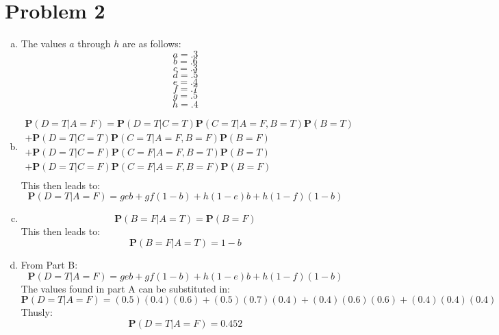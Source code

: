 \documentclass[12pt]{article}%
\begin{document}
\section*{Problem 2}
    \begin{enumerate}[a)]
        \item The values $a$ through $h$ are as follows:
            \[a=.3\]
            \[b=.6\]
            \[c=.3\]
            \[d=.5\]
            \[e=.4\]
            \[f=.7\]
            \[g=.5\]
            \[h=.4\]
        \newpage
        \item
            \begin{align*}
                \textbf{P}(D=T | A=F) = \textbf{P}(D=T|C=T)\textbf{P}(C=T|A=F,B=T)\textbf{P}(B=T)\\
                +\textbf{P}(D=T|C=T)\textbf{P}(C=T|A=F,B=F)\textbf{P}(B=F)\\
                +\textbf{P}(D=T|C=F)\textbf{P}(C=F|A=F,B=T)\textbf{P}(B=T)\\
                +\textbf{P}(D=T|C=F)\textbf{P}(C=F|A=F,B=F)\textbf{P}(B=F)\\
            \end{align*}
            This then leads to:
            \[\textbf{P}(D=T|A=F)= geb+gf(1-b)+h(1-e)b+h(1-f)(1-b)\]
        \item
            \[\textbf{P}(B = F | A = T) = \textbf{P}(B = F)\]
            This then leads to:
            \[\textbf{P}(B = F | A = T) = 1-b\]
        \item
            From Part B:
            \[\textbf{P}(D=T|A=F) = geb+gf(1-b)+h(1-e)b+h(1-f)(1-b)\]
            The values found in part A can be substituted in:
            \[\textbf{P}(D=T|A=F) = (0.5)(0.4)(0.6)+(0.5)(0.7)(0.4)+(0.4)(0.6)(0.6)+(0.4)(0.4)(0.4)\]
            Thusly:
            \[\textbf{P}(D=T|A=F) = 0.452\]
    \end{enumerate}
\end{document}

